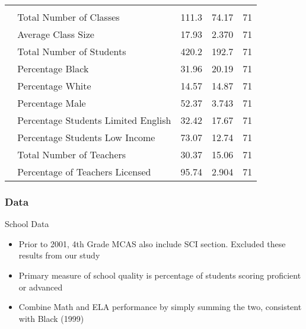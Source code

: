 \documentclass{beamer}
\begin{document}
\begin{frame}
\begin{table}[H]
\begin{tabularx}{\textwidth}{l C C C}
&&&\\\
\hspace{5mm} Total Number of Classes & 111.3 & 74.17 & 71 \\\
\hspace{5mm} Average Class Size & 17.93 & 2.370 & 71 \\\
\hspace{5mm} Total Number of Students & 420.2 & 192.7 & 71 \\\
\hspace{5mm} Percentage Black & 31.96 & 20.19 & 71 \\\
\hspace{5mm} Percentage White & 14.57 & 14.87 & 71 \\\
\hspace{5mm} Percentage Male & 52.37 & 3.743 & 71 \\\
\hspace{5mm} Percentage Students Limited English & 32.42 & 17.67 & 71 \\\
\hspace{5mm} Percentage Students Low Income & 73.07 & 12.74 & 71 \\\
\hspace{5mm} Total Number of Teachers & 30.37 & 15.06 & 71 \\\
\hspace{5mm} Percentage of Teachers Licensed & 95.74 & 2.904 & 71 \\ \hline
\end{tabularx}
\end{table}
\end{frame}

\begin{frame}
\label{Data}
\frametitle{Data}
School Data
\begin{itemize}
\item Prior to 2001, 4th Grade MCAS also include SCI section. Excluded these results from our study
\newline
\item Primary measure of school quality is percentage of students scoring proficient or advanced
\newline
\item Combine Math and ELA performance by simply summing the two, consistent with Black (1999)
\end{itemize}
\end{frame}
\end{document}
